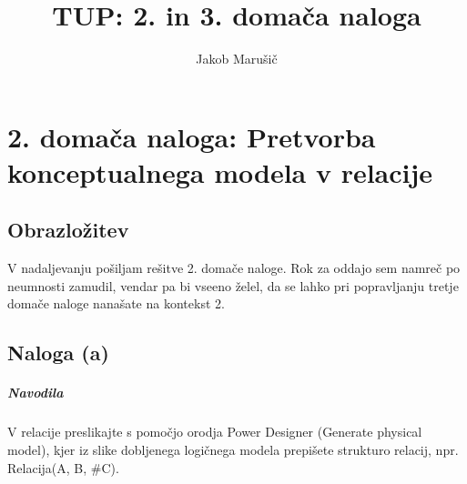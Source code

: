 \documentclass[a4paper,12pt]{report}
\begin{document}
\title{TUP: 2. in 3. domača naloga}
\author{Jakob Marušič}
\maketitle

\chapter*{2. domača naloga: Pretvorba konceptualnega modela v relacije}

\section*{Obrazložitev}
V nadaljevanju pošiljam rešitve 2. domače naloge. Rok za oddajo sem namreč po neumnosti zamudil, vendar pa bi vseeno želel, da se lahko pri popravljanju tretje domače naloge nanašate na kontekst 2.
\pagebreak

\section*{Naloga (a)}

\paragraph{Navodila}
\begin{em}
  V relacije preslikajte s pomočjo orodja Power Designer (Generate physical model), kjer iz slike dobljenega logičnega modela prepišete strukturo relacij, npr. Relacija(A, B, \#C).
\end{em}
\end{document}

